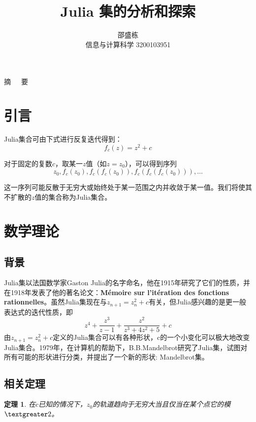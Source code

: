 \documentclass[UTF8,a4paper]{ctexart}
\title{\textbf{\huge{Julia 集的分析和探索}}}
\author{邵盛栋\\信息与计算科学 3200103951}
\newtheorem{thm}{定理}
\begin{document}
	\newcommand{\supercite}[1]{\textsuperscript{\cite{#1}}}
	\maketitle
	\setlength{\oddsidemargin}{ 1cm} 
	\setlength{\evensidemargin}{\oddsidemargin}
	\setlength{\textwidth}{13.50cm}
	\vspace{-0.2cm}

	\begin{center}  \parbox{\textwidth}{  {\heiti 摘~~~要}}  
	\end{center}
	
	\section{引言}
	Julia集合可由下式进行反复迭代得到：
	\[f_{c}(z)=z^{2}+c\]
	
	对于固定的复数$ c $，取某一$ z $值（如$ z=z_{0} $），可以得到序列
	\[z_{0},f_{c}(z_{0}),f_{c}(f_{c}(z_{0})),f_{c}(f_{c}(f_{c}(z_{0}))),\dots\]
	
	这一序列可能反散于无穷大或始终处于某一范围之内并收敛于某一值。我们将使其不扩散的$ z $值的集合称为Julia集合。
	\section{数学理论}
	\subsection{背景}
	Julia集以法国数学家Gaston Julia的名字命名，他在1915年研究了它们的性质，并在1918年发表了他的著名论文：\textbf{Mémoire sur l'itération des fonctions rationnelles}。虽然Julia集现在与$ z_{n+1}=z_{n}^{2}+c $有关，但Julia感兴趣的是更一般表达式的迭代性质，即
	\[z^{4}+\dfrac{z^{3}}{z-1}+\dfrac{z^{2}}{z^{3}+4z^{2}+5}+c\]
	由$ z_{n+1}=z_{n}^{2}+c $定义的Julia集合可以有各种形状，c的一个小变化可以极大地改变Julia集合。1979年，在计算机的帮助下，B.B.Mandelbrot研究了Julia集，试图对所有可能的形状进行分类，并提出了一个新的形状: Mandelbrot集\cite{douady1986julia}。
	\subsection{相关定理}
	\begin{thm} 
		在$c$已知的情况下，$ z_{0} $的轨道趋向于无穷大当且仅当在某个点它的模$ \textgreater2 $。
	\end{thm}
	
\end{document}
